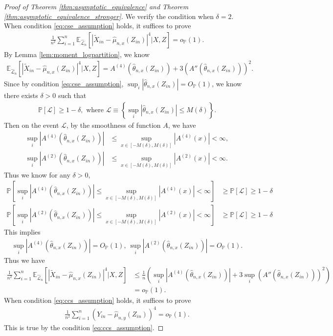 \documentclass[12pt]{article}
\theoremstyle{definition}
\def\P{\mathbb{P}}
\def\P{\mathbb{P}}
\newcommand{\E}{\mathbb E}								%
\renewcommand{\P}{\mathbb{P}}							%
\newcommand{\srx}{X}									%
\newcommand{\srz}{Z}									%
\newcommand{\srxk}{\widetilde X}						%
\newcommand{\sry}{Y}									%
\newcommand{\lawhat}{\widehat{\mathcal L}}				%
\begin{document}
\begin{proof}[Proof of Theorem \ref{thm:asymptotic_equivalence} and Theorem \ref{thm:asymptotic_equivalence_stronger}]
  We verify the condition when $\delta=2$. When condition \eqref{eq:cse_assumption} holds, it suffices to prove 
  \begin{align*}
    \frac{1}{n^2}\sum_{i=1}^n \E_{\lawhat_n}[|\srxk_{in}-\widehat\mu_{n,x}(\srz_{in})|^4|\srx,\srz]=o_{\P}(1).
  \end{align*}
  By Lemma \ref{lem:moment_logpartition}, we know 
  \begin{align*}
    \E_{\lawhat_n}[|\srxk_{in}-\widehat\mu_{n,x}(\srz_{in})|^4|\srx,\srz]=A^{(4)}(\widehat{\theta}_{n,x}(\srz_{in}))+3(A''(\widehat{\theta}_{n,x}(\srz_{in})))^2. 
  \end{align*}
  Since by condition \eqref{eq:cse_assumption}, $\sup_{i}|\widehat{\theta}_{n,x}(\srz_{in})|=O_{\P}(1)$, we know there exists $\delta>0$ such that 
  \begin{align*}
    \P\left[\mathcal{L}\right]\geq 1-\delta,\text{ where }\mathcal{L}\equiv \left\{\sup_{i}|\widehat{\theta}_{n,x}(\srz_{in})|\leq M(\delta)\right\}.
  \end{align*}
  Then on the event $\mathcal{L}$, by the smoothness of function $A$, we have
  \begin{align*}
    \sup_i|A^{(4)}(\widehat{\theta}_{n,x}(\srz_{in}))|
    &
    \leq \sup_{x\in [-M(\delta),M(\delta)]}|A^{(4)}(x)|<\infty,\\ 
    \sup_i|A^{(2)}(\widehat{\theta}_{n,x}(\srz_{in}))|
    &
    \leq \sup_{x\in [-M(\delta),M(\delta)]}|A^{(2)}(x)|<\infty.
  \end{align*}
  Thus we know for any $\delta>0$,
  \begin{align*}
    \P\left[\sup_{i}|A^{(4)}(\widehat{\theta}_{n,x}(\srz_{in}))|\leq \sup_{x\in [-M(\delta),M(\delta)]}|A^{(4)}(x)|<\infty\right]
    &
    \geq\P[\mathcal{L}]\geq 1-\delta\\
    \P\left[\sup_{i}|A^{(2)}(\widehat{\theta}_{n,x}(\srz_{in}))|\leq \sup_{x\in [-M(\delta),M(\delta)]}|A^{(2)}(x)|<\infty\right]
    &
    \geq\P[\mathcal{L}]\geq 1-\delta
  \end{align*}
  This implies
  \begin{align*}
    \sup_i|A^{(4)}(\widehat{\theta}_{n,x}(\srz_{in}))|=O_{\P}(1),\ \sup_i |A^{(2)}(\widehat{\theta}_{n,x}(\srz_{in}))|=O_{\P}(1).
  \end{align*}
  Thus we have 
  \begin{align*}
    \frac{1}{n^2}\sum_{i=1}^n \E_{\lawhat_n}[|\srxk_{in}-\widehat\mu_{n,x}(\srz_{in})|^4|\srx,\srz]
    &
    \leq \frac{1}{n}\left(\sup_i|A^{(4)}(\widehat{\theta}_{n,x}(\srz_{in}))|+3\sup_i(A''(\widehat{\theta}_{n,x}(\srz_{in})))^2\right)\\
    &
    =o_{\P}(1).
  \end{align*}
  When condition \eqref{eq:ccs_assumption} holds, it suffices to prove 
  \begin{align*}
    \frac{1}{n^2}\sum_{i=1}^n (\sry_{in}-\widehat{\mu}_{n,y}(\srz_{in}))^4=o_{\P}(1).
  \end{align*}
  This is true by the condition \eqref{eq:ccs_assumption}.


\end{proof}
\end{document}

